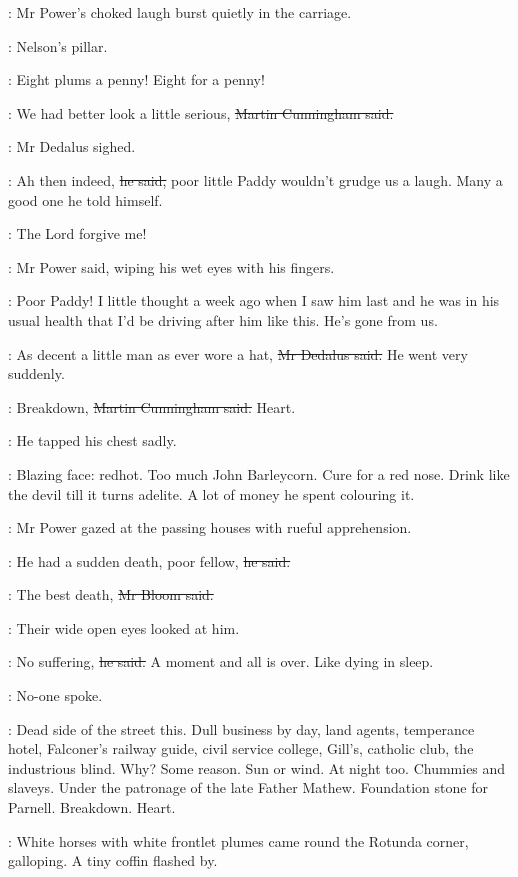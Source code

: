 :
Mr Power's choked laugh burst quietly in the carriage.

\BloomInt:
Nelson's pillar.

\woman:
Eight plums a penny!
Eight for a penny!

\cunningham:
We had better look a little serious,
\sout{Martin Cunningham said.}

:
Mr Dedalus sighed.

\simon:
Ah then indeed,
\sout{he said,}
poor little Paddy wouldn't grudge us a laugh.
Many a good one he told himself.

\power:
The Lord forgive me!

:
Mr Power said,
wiping his wet eyes with his fingers.

\power:
Poor Paddy!
I little thought a week ago
when I saw him last
and he was in his usual health
that I'd be driving after him like this.
He's gone from us.

\simon:
As decent a little man as ever wore a hat,
\sout{Mr Dedalus said.}
He went very suddenly.

\cunningham:
Breakdown,
\sout{Martin Cunningham said.}
Heart.

:
He tapped his chest sadly.

\BloomInt:
Blazing face:
redhot.
Too much John Barleycorn.
Cure for a red nose.
Drink like the devil till it turns adelite.
A lot of money he spent colouring it.

:
Mr Power gazed at the passing houses with rueful apprehension.

\power:
He had a sudden death, poor fellow,
\sout{he said.}

\Bloom:
The best death,
\sout{Mr Bloom said.}

:
Their wide open eyes looked at him.

\Bloom:
No suffering,
\sout{he said.}
A moment and all is over.
Like dying in sleep.

:
No-one spoke.

\BloomInt:
Dead side of the street this.
Dull business by day,
land agents, temperance hotel,
Falconer's railway guide, civil service college,
Gill's, catholic club, the industrious blind.
Why?
Some reason.
Sun or wind.
At night too.
Chummies and slaveys.
Under the patronage of the late Father Mathew.
Foundation stone for Parnell.
Breakdown.
Heart.

:
White horses with white frontlet plumes came round the Rotunda corner,
galloping.
A tiny coffin flashed by.

